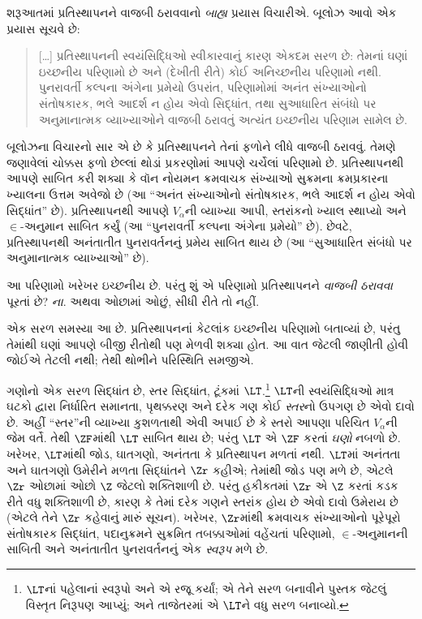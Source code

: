 શરૂઆતમાં પ્રતિસ્થાપનને વાજબી ઠરાવવાનો \emph{બાહ્ય} પ્રયાસ
વિચારીએ. બૂલોઝ આવો એક પ્રયાસ સૂચવે છે:
\begin{quote}
  [\ldots] પ્રતિસ્થાપનની સ્વયંસિદ્ધિઓ સ્વીકારવાનું કારણ એકદમ
  સરળ છે: તેમનાં ઘણાં ઇચ્છનીય પરિણામો છે અને (દેખીતી રીતે)
  કોઈ અનિચ્છનીય પરિણામો નથી. પુનરાવર્તી કલ્પના અંગેના
  પ્રમેયો ઉપરાંત, પરિણામોમાં અનંત સંખ્યાઓનો સંતોષકારક,
  ભલે આદર્શ ન હોય એવો સિદ્ધાંત, તથા સુઆધારિત સંબંધો પર
  અનુમાનાત્મક વ્યાખ્યાઓને વાજબી ઠરાવતું અત્યંત ઇચ્છનીય
  પરિણામ સામેલ છે.
  \citep[229]{Boolos1971}
\end{quote}
બૂલોઝના વિચારનો સાર એ છે કે પ્રતિસ્થાપનને તેનાં ફળોને લીધે
વાજબી ઠરાવવું. તેમણે જણાવેલાં ચોક્કસ ફળો છેલ્લાં થોડાં
પ્રકરણોમાં આપણે ચર્ચેલાં પરિણામો છે. પ્રતિસ્થાપનથી આપણે
સાબિત કરી શક્યા કે વૉન નોયમન ક્રમવાચક સંખ્યાઓ સુક્રમના
ક્રમપ્રકારના ખ્યાલના ઉત્તમ અવેજો છે (આ ``અનંત સંખ્યાઓનો
સંતોષકારક, ભલે આદર્શ ન હોય એવો સિદ્ધાંત'' છે).
પ્રતિસ્થાપનથી આપણે $V_\alpha$ની વ્યાખ્યા આપી, સ્તરાંકનો
ખ્યાલ સ્થાપ્યો અને $\in$-અનુમાન સાબિત કર્યું (આ
``પુનરાવર્તી કલ્પના અંગેના પ્રમેયો'' છે). છેવટે,
પ્રતિસ્થાપનથી અનંતાતીત પુનરાવર્તનનું પ્રમેય સાબિત થાય છે
(આ ``સુઆધારિત સંબંધો પર અનુમાનાત્મક વ્યાખ્યાઓ'' છે).

આ પરિણામો ખરેખર ઇચ્છનીય છે. પરંતુ શું એ પરિણામો
પ્રતિસ્થાપનને \emph{વાજબી ઠરાવવા} પૂરતાં છે? \emph{ના}.
અથવા ઓછામાં ઓછું, સીધી રીતે તો નહીં.

એક સરળ સમસ્યા આ છે. પ્રતિસ્થાપનનાં કેટલાંક ઇચ્છનીય
પરિણામો બતાવ્યાં છે, પરંતુ તેમાંથી ઘણાં આપણે બીજી રીતોથી
પણ મેળવી શક્યા હોત. આ વાત જેટલી જાણીતી હોવી જોઈએ
તેટલી નથી; તેથી થોભીને પરિસ્થિતિ સમજીએ.

ગણોનો એક સરળ સિદ્ધાંત છે, સ્તર સિદ્ધાંત, ટૂંકમાં
$\LT$.\footnote{$\LT$નાં પહેલાનાં સ્વરૂપો \citet{Montague1965}
અને \citet{Scott1974}એ રજૂ કર્યાં; \citet{Potter2004}એ તેને
સરળ બનાવીને પુસ્તક જેટલું વિસ્તૃત નિરૂપણ આપ્યું; અને
તાજેતરમાં \citet{ButtonLT1}એ $\LT$ને વધુ સરળ બનાવ્યો.}
$\LT$ની સ્વયંસિદ્ધિઓ માત્ર ઘટકો દ્વારા નિર્ધારિત સમાનતા,
પૃથક્કરણ અને
દરેક ગણ કોઈ \emph{સ્તર}નો ઉપગણ છે એવો દાવો છે. અહીં
``સ્તર''ની વ્યાખ્યા કુશળતાથી એવી અપાઈ છે કે સ્તરો
આપણા પરિચિત $V_\alpha$ની જેમ વર્તે. તેથી $\ZF$માંથી
$\LT$ સાબિત થાય છે; પરંતુ $\LT$ એ $\ZF$ કરતાં
\emph{ઘણો} નબળો છે. ખરેખર, $\LT$માંથી જોડ, ઘાતગણો,
અનંતતા કે પ્રતિસ્થાપન મળતાં નથી. $\LT$માં અનંતતા અને
ઘાતગણો ઉમેરીને મળતા સિદ્ધાંતને $\Zr$ કહીએ; તેમાંથી
જોડ પણ મળે છે, એટલે $\Zr$ ઓછામાં ઓછો $\Z$ જેટલો
શક્તિશાળી છે. પરંતુ હકીકતમાં $\Zr$ એ $\Z$ કરતાં
કડક રીતે વધુ શક્તિશાળી છે, કારણ કે તેમાં દરેક ગણને સ્તરાંક
હોય છે એવો દાવો ઉમેરાય છે (એટલે તેને $\Zr$ કહેવાનું
મારું સૂચન). ખરેખર, $\Zr$માંથી ક્રમવાચક સંખ્યાઓનો
પૂરેપૂરો સંતોષકારક સિદ્ધાંત, પદાનુક્રમને સુક્રમિત તબક્કાઓમાં
વહેંચતાં પરિણામો, $\in$-અનુમાનની સાબિતી અને અનંતાતીત
પુનરાવર્તનનું એક \emph{સ્વરૂપ} મળે છે.

